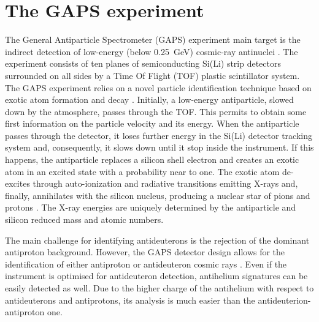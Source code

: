 
\section{The GAPS experiment}
\label{appendixGAPSexperiment}
The General Antiparticle Spectrometer (GAPS) experiment main target is the indirect detection of low-energy (below \SI{0.25}{\giga\electronvolt}) cosmic-ray antinuclei \cite{doetinchem_2020_cosmicray}. The experiment consists of ten planes of semiconducting Si(Li) strip detectors surrounded on all sides by a Time Of Flight (TOF) plastic scintillator system. The GAPS experiment relies on a novel particle identification technique based on exotic atom formation and decay \cite{re_2022_a}\cite{re_2022_b}. Initially, a low-energy antiparticle, slowed down by the atmosphere, passes through the TOF. This permits to obtain some first information on the particle velocity and its energy. When the antiparticle passes through the detector, it loses further energy in the Si(Li) detector tracking system and, consequently, it slows down until it stop inside the instrument. If this happens, the antiparticle replaces a silicon shell electron and creates an exotic atom in an excited state with a probability near to one. The exotic atom de-excites through auto-ionization and radiative transitions emitting X-rays and, finally, annihilates with the silicon nucleus, producing a nuclear star of pions and protons \cite{mori_2002_a}. The X-ray energies are uniquely determined by the antiparticle and silicon reduced mass and atomic numbers. 

\par
The main challenge for identifying antideuterons is the rejection of the dominant antiproton background. However, the GAPS detector design allows for the identification of either antiproton or antideuteron cosmic rays \cite{aramaki_2014_potential}. Even if the instrument is optimised for antideuteron detection, antihelium signatures can be easily detected as well. Due to the higher charge of the antihelium with respect to antideuterons and antiprotons, its analysis is much easier than the antideuterion-antiproton one.

